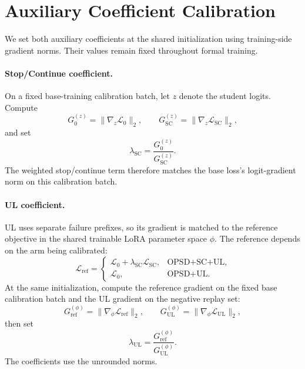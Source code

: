 \documentclass{article} %
\begin{document}
\section{Auxiliary Coefficient Calibration}
\label{app:coefficients}

We set both auxiliary coefficients at the shared initialization using training-side gradient norms. Their values remain fixed throughout formal training.

\paragraph{Stop/Continue coefficient.} On a fixed base-training calibration batch, let $z$ denote the student logits. Compute
\begin{equation}
G_0^{(z)}=\|\nabla_z\mathcal L_0\|_2,\qquad G_{\mathrm{SC}}^{(z)}=\|\nabla_z\mathcal L_{\mathrm{SC}}\|_2,
\label{eq:sc-grad-norms}
\end{equation}
and set
\begin{equation}
\lambda_{\mathrm{SC}}=\frac{G_0^{(z)}}{G_{\mathrm{SC}}^{(z)}}.
\label{eq:sc-weight}
\end{equation}
The weighted stop/continue term therefore matches the base loss's logit-gradient norm on this calibration batch.

\paragraph{UL coefficient.} UL uses separate failure prefixes, so its gradient is matched to the reference objective in the shared trainable LoRA parameter space $\phi$. The reference depends on the arm being calibrated:
\begin{equation}
\mathcal L_{\mathrm{ref}}=\begin{cases}\mathcal L_0+\lambda_{\mathrm{SC}}\mathcal L_{\mathrm{SC}},&\text{OPSD+SC+UL},\\[2pt]\mathcal L_0,&\text{OPSD+UL}.\end{cases}
\label{eq:ul-reference}
\end{equation}
At the same initialization, compute the reference gradient on the fixed base calibration batch and the UL gradient on the negative replay set:
\begin{equation}
G_{\mathrm{ref}}^{(\phi)}=\|\nabla_\phi\mathcal L_{\mathrm{ref}}\|_2,\qquad G_{\mathrm{UL}}^{(\phi)}=\|\nabla_\phi\mathcal L_{\mathrm{UL}}\|_2,
\label{eq:ul-grad-norms}
\end{equation}
then set
\begin{equation}
\lambda_{\mathrm{UL}}=\frac{G_{\mathrm{ref}}^{(\phi)}}{G_{\mathrm{UL}}^{(\phi)}}.
\label{eq:ul-weight}
\end{equation}
The coefficients use the unrounded norms.
\end{document}
